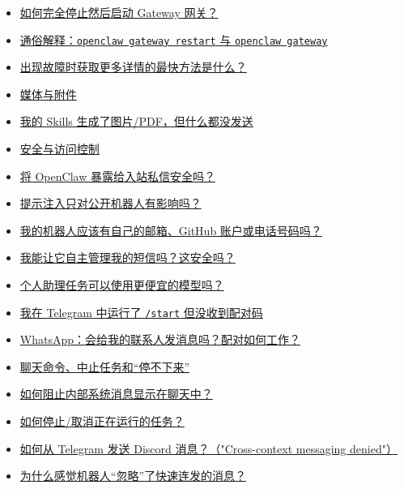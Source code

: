 \begin{itemize}
  \item \href{\#how-do-i-completely-stop-then-start-the-gateway}{如何完全停止然后启动 Gateway 网关？}
  \item \href{\#eli5-openclaw-gateway-restart-vs-openclaw-gateway}{通俗解释：\texttt{openclaw gateway restart} 与 \texttt{openclaw gateway}}
  \item \href{\#whats-the-fastest-way-to-get-more-details-when-something-fails}{出现故障时获取更多详情的最快方法是什么？}
  \item \href{\#media-attachments}{媒体与附件}
  \item \href{\#my-skill-generated-an-imagepdf-but-nothing-was-sent}{我的 Skills 生成了图片/PDF，但什么都没发送}
  \item \href{\#security-and-access-control}{安全与访问控制}
  \item \href{\#is-it-safe-to-expose-openclaw-to-inbound-dms}{将 OpenClaw 暴露给入站私信安全吗？}
  \item \href{\#is-prompt-injection-only-a-concern-for-public-bots}{提示注入只对公开机器人有影响吗？}
  \item \href{\#should-my-bot-have-its-own-email-github-account-or-phone-number}{我的机器人应该有自己的邮箱、GitHub 账户或电话号码吗？}
  \item \href{\#can-i-give-it-autonomy-over-my-text-messages-and-is-that-safe}{我能让它自主管理我的短信吗？这安全吗？}
  \item \href{\#can-i-use-cheaper-models-for-personal-assistant-tasks}{个人助理任务可以使用更便宜的模型吗？}
  \item \href{\#i-ran-start-in-telegram-but-didnt-get-a-pairing-code}{我在 Telegram 中运行了 \texttt{/start} 但没收到配对码}
  \item \href{\#whatsapp-will-it-message-my-contacts-how-does-pairing-work}{WhatsApp：会给我的联系人发消息吗？配对如何工作？}
  \item \href{\#chat-commands-aborting-tasks-and-it-wont-stop}{聊天命令、中止任务和“停不下来”}
  \item \href{\#how-do-i-stop-internal-system-messages-from-showing-in-chat}{如何阻止内部系统消息显示在聊天中？}
  \item \href{\#how-do-i-stopcancel-a-running-task}{如何停止/取消正在运行的任务？}
  \item \href{\#how-do-i-send-a-discord-message-from-telegram-crosscontext-messaging-denied}{如何从 Telegram 发送 Discord 消息？（"Cross-context messaging denied"）}
  \item \href{\#why-does-it-feel-like-the-bot-ignores-rapidfire-messages}{为什么感觉机器人“忽略”了快速连发的消息？}
\end{itemize}


